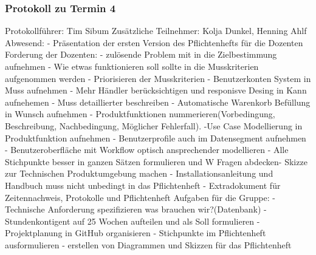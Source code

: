  \subsubsection{Protokoll zu Termin 4}
 Protokollführer: Tim Sibum \newline
Zusätzliche Teilnehmer: Kolja Dunkel, Henning Ahlf \newline
Abwesend: - \newline \newline
Präsentation der ersten Version des Pflichtenhefts für die Dozenten \newline\newline
Forderung der Dozenten:\newline
  - zulösende Problem mit in die Zielbestimmung aufnehmen\newline
  - Wie etwas funktionieren soll sollte in die Musskriterien aufgenommen werden
  \newline 
  - Priorisieren der Musskriterien\newline
  - Benutzerkonten System in Muss aufnehmen\newline
  - Mehr Händler berücksichtigen und responisve Desing in Kann aufnehemen\newline
  - Muss detaillierter beschreiben\newline
  - Automatische Warenkorb Befüllung in Wunsch aufnehmen\newline
  - Produktfunktionen nummerieren(Vorbedingung, Beschreibung\newline, 
  Nachbedingung, Möglicher Fehlerfall).\newline
  -Use Case Modellierung in Produktfunktion aufnehmen\newline
  - Benutzerprofile auch im Datensegment aufnehmen\newline
  - Benutzeroberfläche mit Workflow optisch ansprechender modellieren\newline
  - Alle Stichpunkte besser in ganzen Sätzen formulieren und W Fragen abdecken\newline 	  - Skizze zur Technischen Produktumgebung machen\newline
  - Installationsanleitung und Handbuch muss nicht unbedingt in das Pflichtenheft\newline 
  - Extradokument für Zeitennachweis, Protokolle und Pflichtenheft \newline 
Aufgaben für die Gruppe:\newline
  - Technische Anforderung spezifizieren was brauchen wir?(Datenbank)\newline        
  - Stundenkontigent auf 25 Wochen aufteilen und als Soll formulieren \newline
  - Projektplanung in GitHub organisieren\newline
  - Stichpunkte im Pflichtenheft ausformulieren \newline
  - erstellen von Diagrammen und Skizzen für das Pflichtenheft \newline
